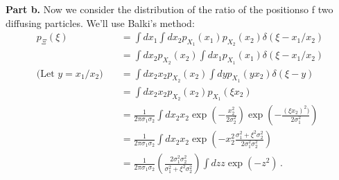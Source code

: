 \textbf{Part b.} Now we consider the distribution of the ratio of the positionso f two diffusing particles.
We'll use Balki's method:
\begin{align*}
  p_\Xi(\xi)
  &= \int dx_1 \int dx_2 p_{X_1}(x_1) p_{X_2}(x_2) \delta ( \xi - x_1 / x_2) \\
  &= \int dx_2 p_{X_2}(x_2) \int dx_1 p_{X_1}(x_1) \delta ( \xi - x_1 / x_2) \\
  \text{(Let $y = x_1/x_2$)} \quad
  &= \int dx_2 x_2 p_{X_2}(x_2) \int dy p_{X_1}(y x_2) \delta ( \xi - y) \\
  &= \int dx_2 x_2 p_{X_2}(x_2) p_{X_1}(\xi x_2) \\
  &= \frac{1}{2\pi \sigma_1 \sigma_2}
    \int dx_2 x_2
      \exp \left( - \frac{x_2^2}{2 \sigma_2^2}\right)
      \exp \left( - \frac{(\xi x_2)^2)}{2 \sigma_1^2} \right) \\
  &= \frac{1}{2\pi \sigma_1 \sigma_2}
    \int dx_2 x_2 \exp \left( - x_2^2 \frac{\sigma_1^2 + \xi^2 \sigma_2^2}{2 \sigma_1^2 \sigma_2^2}\right) \\
  &= \frac{1}{2\pi \sigma_1 \sigma_2} \left( \frac{2 \sigma_1^2 \sigma_2^2}{\sigma_1^2 + \xi^2 \sigma_2^2}\right)
    \int dz z \exp \left( -z^2 \right)
  \, .
\end{align*}
